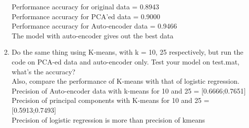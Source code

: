 \begin{enumerate}
Performance accuracy for original data = 0.8943 \\
Performance accuracy for PCA'ed data = 0.9000 \\
Performance accuracy for Auto-encoder data = 0.9466 \\

The model with auto-encoder gives out the best data \\

\item Do the same thing using K-means, with k = 10, 25 respectively, but run the code on PCA-ed data and auto-encoder only. Test your model on test.mat, what's the accuracy? \\
Also, compare the performance of K-means with that of logistic regression. \\

Precision of Auto-encoder data with k-means for 10 and 25 = [0.6666;0.7651] \\
Precision of principal components with K-means for 10 and 25 = [0.5913;0.7493] \\

Precision of logistic regression is more than precision of kmeans \\

\end{enumerate}
